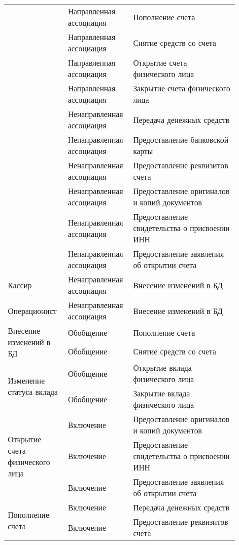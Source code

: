 \documentclass[a4paper,14pt]{extarticle}
\begin{document}
\begin{longtable}{|m{0.25\linewidth}|m{0.24\linewidth}|m{0.44\linewidth}|}
	\hline \hline
	\endlastfoot
	\multirow{4}{\linewidth}{Клиент} & Направленная   ассоциация & Пополнение счета \\ \cline{2-3}
	& Направленная   ассоциация & Снятие средств со счета \\ \cline{2-3}
	& Направленная   ассоциация & Открытие счета физического лица \\ \cline{2-3}
	& Направленная   ассоциация & Закрытие счета физического лица \\ \cline{2-3}
	& Ненаправленная ассоциация & Передача денежных средств \\ \cline{2-3}
	& Ненаправленная ассоциация & Предоставление банковской карты \\ \cline{2-3}
	& Ненаправленная ассоциация & Предоставление реквизитов счета \\ \cline{2-3}
	& Ненаправленная ассоциация & Предоставление оригиналов и копий документов \\ \cline{2-3}
	& Ненаправленная ассоциация & Предоставление свидетельства о присвоении ИНН \\ \cline{2-3}
	& Ненаправленная ассоциация & Предоставление заявления об открытии счета \\ \hline
	Кассир       & Ненаправленная ассоциация & Внесение изменений в БД \\ \hline
	Операционист & Ненаправленная ассоциация & Внесение изменений в БД \\ \hline
	\multirow{2}{\linewidth}{Внесение изменений в БД} & Обобщение & Пополнение счета \\ \cline{2-3}
	& Обобщение & Снятие средств со счета \\ \hline
	\multirow{2}{\linewidth}{Изменение статуса вклада} & Обобщение & Открытие вклада физического лица \\ \cline{2-3}
	& Обобщение & Закрытие вклада физического лица \\ \hline
	\multirow{3}{\linewidth}{Открытие счета физического лица} & Включение & Предоставление оригиналов и копий документов \\ \cline{2-3}
	& Включение & Предоставление свидетельства о присвоении ИНН \\ \cline{2-3}
	& Включение & Предоставление заявления об открытии счета \\ \hline
	\multirow{2}{\linewidth}{Пополнение счета} & Включение & Передача денежных средств \\ \cline{2-3}
	& Включение & Предоставление реквизитов счета \\ \hline
	

\end{longtable}
\end{document}
